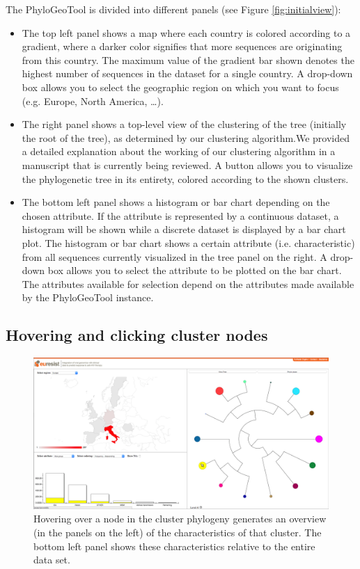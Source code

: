 \documentclass[a4paper, 11pt]{article} %
\begin{document}
The PhyloGeoTool is divided into different panels (see Figure \ref{fig:initialview}): 
\begin{itemize}
  \item The top left panel shows a map where each country is colored according to a gradient, where a darker color signifies that more sequences are originating from this country. The maximum value of the gradient bar shown denotes the highest number of sequences in the dataset for a single country.  
    A drop-down box allows you to select the geographic region on which you want to focus (e.g. Europe, North America, \ldots).
  \item The right panel shows a top-level view of the clustering of the tree (initially the root of the tree), as determined by our clustering algorithm.We provided a detailed explanation about the working of our clustering algorithm in a manuscript that is currently being reviewed. %
A button allows you to visualize the phylogenetic tree in its entirety, colored according to the shown clusters.
  \item The bottom left panel shows a histogram or bar chart depending on the chosen attribute. If the attribute is represented by a continuous dataset, a histogram will be shown while a discrete dataset is displayed by a bar chart plot.
  The histogram or bar chart shows a certain attribute (i.e. characteristic) from all sequences currently visualized in the tree panel on the right. 
  A drop-down box allows you to select the attribute to be plotted on the bar chart. 
  The attributes available for selection depend on the attributes made available by the PhyloGeoTool instance.
\end{itemize}


\subsection{Hovering and clicking cluster nodes}
\begin{figure}[H]
\centering
\includegraphics[scale=0.1875]{images/hover_node.PNG}
\vspace{-0.75cm}
\caption{Hovering over a node in the cluster phylogeny generates an overview (in the panels on the left) of the characteristics of that cluster. The bottom left panel shows these characteristics relative to the entire data set.}
\label{fig:hovernode}
\end{figure}
\end{document}

